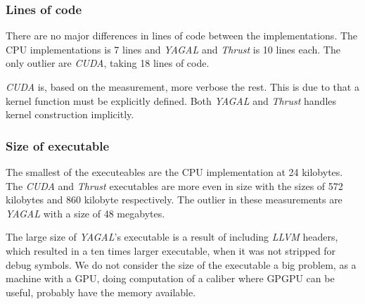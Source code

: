 \subsubsection[*]{Lines of code}
There are no major differences in lines of code between the implementations. The CPU implementations is 7 lines and \textit{YAGAL} and \textit{Thrust} is 10 lines each. The only outlier are \textit{CUDA}, taking 18 lines of code. 

\textit{CUDA} is, based on the measurement, more verbose the rest. This is due to that a kernel function must be explicitly defined. Both \textit{YAGAL} and \textit{Thrust} handles kernel construction implicitly.

\subsubsection[*]{Size of executable}
The smallest of the executeables are the CPU implementation at 24 kilobytes. The \textit{CUDA} and \textit{Thrust} executables are more even in size with the sizes of 572 kilobytes and 860 kilobyte respectively. The outlier in these measurements are \textit{YAGAL} with a size of 48 megabytes.

The large size of \textit{YAGAL}'s executable is a result of including \textit{LLVM} headers, which resulted in a ten times larger executable, when it was not stripped for debug symbols. We do not consider the size of the executable a big problem, as a machine with a GPU, doing computation of a caliber where GPGPU can be useful, probably have the memory available. 

